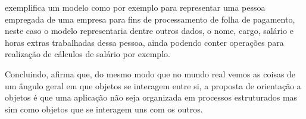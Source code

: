 \par {}
exemplifica um modelo como por exemplo para representar uma pessoa empregada de
uma empresa para fins de processamento de folha de pagamento, neste caso o
modelo representaria dentre outros dados, o nome, cargo, salário e horas extras
trabalhadas dessa pessoa, ainda podendo conter operações para realização
de cálculos de salário por exemplo.

\par Concluindo,  afirma que, do mesmo modo 
que no mundo real vemos as coisas de um ângulo geral em que objetos se
interagem entre si, a proposta de orientação a objetos é que uma  
aplicação não seja organizada em processos estruturados mas
sim como objetos que se interagem uns com os outros.




% 


% 


